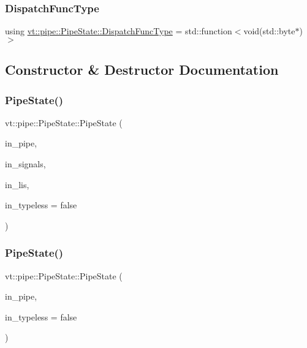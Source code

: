 \subsubsection{\texorpdfstring{Dispatch\+Func\+Type}{DispatchFuncType}}
{\footnotesize\ttfamily using \hyperlink{structvt_1_1pipe_1_1_pipe_state_aa6d3f6b8d9c1a4d1f261bc563ff99e3e}{vt\+::pipe\+::\+Pipe\+State\+::\+Dispatch\+Func\+Type} =  std\+::function$<$void(std\+::byte$\ast$)$>$}



\subsection{Constructor \& Destructor Documentation}
\mbox{\label{structvt_1_1pipe_1_1_pipe_state_ae243864cd9ea61ddc564b6b3a0870eb4}} 
\subsubsection{\texorpdfstring{Pipe\+State()}{PipeState()}\hspace{0.1cm}{\footnotesize\ttfamily [1/2]}}
{\footnotesize\ttfamily vt\+::pipe\+::\+Pipe\+State\+::\+Pipe\+State (\begin{DoxyParamCaption}\item[{\hyperlink{namespacevt_ac9852acda74d1896f48f406cd72c7bd3}{Pipe\+Type} const \&}]{in\+\_\+pipe,  }\item[{\hyperlink{namespacevt_ace18d74dd489d9ea506d38789fffce34}{Pipe\+Ref\+Type} const \&}]{in\+\_\+signals,  }\item[{\hyperlink{namespacevt_ace18d74dd489d9ea506d38789fffce34}{Pipe\+Ref\+Type} const \&}]{in\+\_\+lis,  }\item[{bool const \&}]{in\+\_\+typeless = {\ttfamily false} }\end{DoxyParamCaption})}

\mbox{\label{structvt_1_1pipe_1_1_pipe_state_a2f6a2a7f657b0938d0214fc16b65969c}} 
\subsubsection{\texorpdfstring{Pipe\+State()}{PipeState()}\hspace{0.1cm}{\footnotesize\ttfamily [2/2]}}
{\footnotesize\ttfamily vt\+::pipe\+::\+Pipe\+State\+::\+Pipe\+State (\begin{DoxyParamCaption}\item[{\hyperlink{namespacevt_ac9852acda74d1896f48f406cd72c7bd3}{Pipe\+Type} const \&}]{in\+\_\+pipe,  }\item[{bool const \&}]{in\+\_\+typeless = {\ttfamily false} }\end{DoxyParamCaption})}



